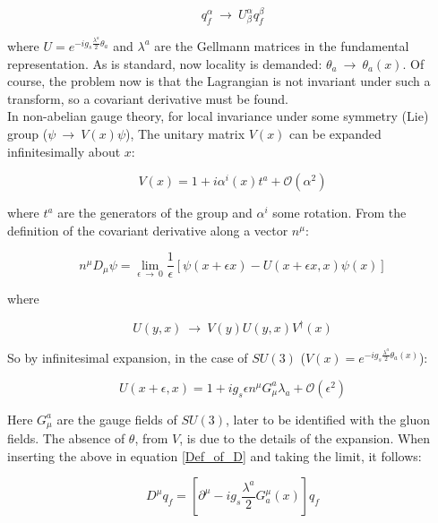 \documentclass[11pt,a4paper]{article}
\begin{document}
\begin{equation}
	q_f^\alpha \:\rightarrow\: U^\alpha_\beta q_f^\beta
\end{equation} 

where $U = e^{-ig_s\frac{\lambda^a}{2}\theta_a}$ and $\lambda^a$ are the Gellmann matrices in the fundamental representation. As is standard, now locality is demanded: $\theta_a \:\rightarrow\: \theta_a(x)$. Of course, the problem now is that the Lagrangian is not invariant under such a transform, so a covariant derivative must be found.\\
In non-abelian gauge theory, for local invariance under some symmetry (Lie) group ($\psi \:\rightarrow\: V(x)\psi$), The unitary matrix $V(x)$ can be expanded infinitesimally about $x$:

\begin{equation}
	V(x) = 1 + i\alpha^i(x)t^a + \mathcal{O}(\alpha^2)
\end{equation}

where $t^a$ are the generators of the group and $\alpha^i$ some rotation. From the definition of the covariant derivative along a vector $n^\mu$:

\begin{equation}
	n^\mu D_\mu\psi = \lim_{\epsilon\:\rightarrow\:0} \frac{1}{\epsilon}\left[\psi(x+\epsilon x) - U(x+\epsilon x,x)\psi(x)\right]
	\label{Def_of_D}
\end{equation}

where

\begin{equation}
	U(y,x) \:\rightarrow\: V(y)U(y,x)V^\dagger(x)
\end{equation}

So by infinitesimal expansion, in the case of $SU(3)$ ($V(x) = e^{-ig_s\frac{\lambda^a}{2}\theta_a(x)}$):

\begin{equation}
	U(x+\epsilon, x) = 1 + ig_s\epsilon n^\mu G_\mu^a \lambda_a + \mathcal{O}(\epsilon^2)
\end{equation}

Here $G_\mu^a$ are the gauge fields of $SU(3)$, later to be identified with the gluon fields. The absence of $\theta$, from $V$, is due to the details of the expansion. When inserting the above in equation \ref{Def_of_D} and taking the limit, it follows:

\begin{equation}
	D^\mu q_f = \left[ \partial^\mu - ig_s\frac{\lambda^a}{2}G_a^\mu(x) \right]q_f
\end{equation}
\end{document}
